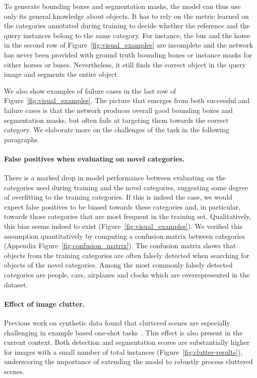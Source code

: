 \documentclass{article}
\begin{document}
To generate bounding boxes and segmentation masks, the model can thus use only its general knowledge about objects. It has to rely on the metric learned on the categories annotated during training to decide whether the reference and the query instances belong to the same category. For instance, the bus and the horse in the second row of Figure~\ref{fig:visual_examples} are incomplete and the network has never been provided with ground truth bounding boxes or instance masks for either horses or buses. Nevertheless, it still finds the correct object in the query image and segments the entire object.

We also show examples of failure cases in the last row of Figure~\ref{fig:visual_examples}. The picture that emerges from both successful and failure cases is that the network produces overall good bounding boxes and segmentation masks, but often fails at targeting them towards the correct category. We elaborate more on the challenges of the task in the following paragraphs.


\paragraph{False positives when evaluating on novel categories.}

There is a marked drop in model performance between evaluating on the categories used during training and the novel categories, suggesting some degree of overfitting to the training categories. If this is indeed the case, we would expect false positives to be biased towards these categories and, in particular, towards those categories that are most frequent in the training set. Qualitatively, this bias seems indeed to exist (Figure~\ref{fig:visual_examples}). We verified this assumption quantitatively by computing a confusion matrix between categories (Appendix Figure~\ref{fig:confusion_matrix}). The confusion matrix shows that objects from the training categories are often falsely detected when searching for objects of the novel categories. Among the most commonly falsely detected categories are people, cars, airplanes and clocks which are overrepresented in the dataset.



\paragraph{Effect of image clutter.}

Previous work on synthetic data found that cluttered scenes are especially challenging in example based one-shot tasks~\cite{Michaelis2018}. This effect is also present in the current context. Both detection and segmentation scores are substantially higher for images with a small number of total instances (Figure~\ref{fig:clutter-results}), underscoring the importance of extending the model to robustly process cluttered scenes.
\end{document}

